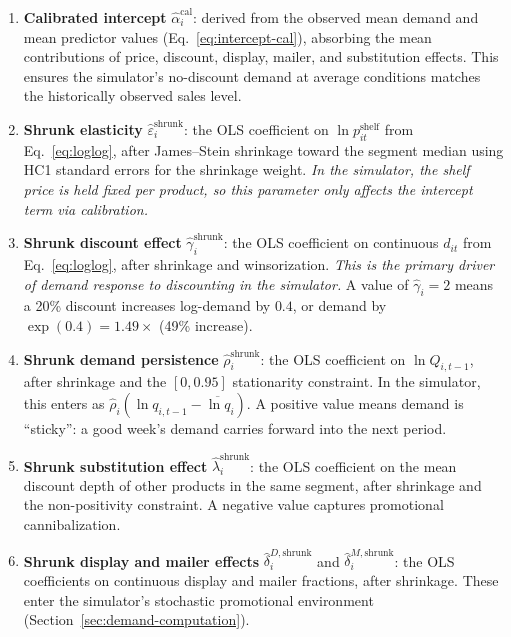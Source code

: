 \documentclass[12pt,a4paper]{article}
\begin{document}
\begin{enumerate}
\item \textbf{Calibrated intercept}
$\hat{\alpha}_i^{\text{cal}}$: derived from the observed mean
demand and mean predictor values (Eq.~\ref{eq:intercept-cal}),
absorbing the mean contributions of price, discount, display,
mailer, and substitution effects. This ensures the simulator's
no-discount demand at average conditions matches the historically
observed sales level.

\item \textbf{Shrunk elasticity}
$\hat{\varepsilon}_i^{\text{shrunk}}$: the OLS coefficient on
$\ln p_{it}^{\text{shelf}}$ from Eq.~\eqref{eq:loglog}, after
James--Stein shrinkage toward the segment median using HC1
standard errors for the shrinkage weight. \emph{In the simulator,
the shelf price is held fixed per product, so this parameter only
affects the intercept term via calibration.}

\item \textbf{Shrunk discount effect}
$\hat{\gamma}_i^{\text{shrunk}}$: the OLS coefficient on continuous
$d_{it}$ from Eq.~\eqref{eq:loglog}, after shrinkage and
winsorization. \emph{This is the primary driver of demand response
to discounting in the simulator.} A value of $\hat{\gamma}_i = 2$
means a 20\% discount increases log-demand by $0.4$, or demand by
$\exp(0.4) = 1.49\times$ (49\% increase).

\item \textbf{Shrunk demand persistence}
$\hat{\rho}_i^{\text{shrunk}}$: the OLS coefficient on
$\ln Q_{i,t-1}$, after shrinkage and the $[0, 0.95]$ stationarity
constraint. In the simulator, this enters as
$\hat{\rho}_i (\ln q_{i,t-1} - \overline{\ln q}_i)$. A positive
value means demand is ``sticky'': a good week's demand carries
forward into the next period.

\item \textbf{Shrunk substitution effect}
$\hat{\lambda}_i^{\text{shrunk}}$: the OLS coefficient on the mean
discount depth of other products in the same segment, after
shrinkage and the non-positivity constraint. A negative value
captures promotional cannibalization.

\item \textbf{Shrunk display and mailer effects}
$\hat{\delta}_i^{D,\text{shrunk}}$ and
$\hat{\delta}_i^{M,\text{shrunk}}$: the OLS coefficients on
continuous display and mailer fractions, after shrinkage.
These enter the simulator's stochastic promotional environment
(Section~\ref{sec:demand-computation}).


\end{enumerate}
\end{document}
